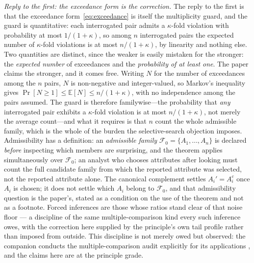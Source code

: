 \textit{Reply to the first: the exceedance form is the correction.}\label{sec:multiplicity} The reply to the first is that the exceedance form~\eqref{eq:exceedance} is itself the multiplicity guard, and the guard is quantitative: each interrogated pair admits a $\kappa$-fold violation with probability at most $1/(1+\kappa)$, so among $n$ interrogated pairs the expected number of $\kappa$-fold violations is at most $n/(1+\kappa)$, by linearity and nothing else. Two quantities are distinct, since the weaker is easily mistaken for the stronger: the \emph{expected number} of exceedances and the \emph{probability of at least one}. The paper claims the stronger, and it comes free. Writing $N$ for the number of exceedances among the $n$ pairs, $N$ is non-negative and integer-valued, so Markov's inequality gives $\Pr[N \ge 1] \le \mathbb{E}[N] \le n/(1+\kappa)$, with no independence among the pairs assumed. The guard is therefore familywise---the probability that \emph{any} interrogated pair exhibits a $\kappa$-fold violation is at most $n/(1+\kappa)$, not merely the average count---and what it requires is that $n$ count the whole admissible family, which is the whole of the burden the selective-search objection imposes. Admissibility has a definition: an \emph{admissible family} $\mathcal{F}_0 = \{A_1, \ldots, A_n\}$ is declared \emph{before} inspecting which members are surprising, and the theorem applies simultaneously over $\mathcal{F}_0$; an analyst who chooses attributes after looking must count the full candidate family from which the reported attribute was selected, not the reported attribute alone. The canonical complement settles $A_i' = A_i^{c}$ once $A_i$ is chosen; it does not settle which $A_i$ belong to $\mathcal{F}_0$, and that admissibility question is the paper's, stated as a condition on the use of the theorem and not as a footnote. Forced inferences are those whose ratios stand clear of that noise floor --- a discipline of the same multiple-comparison kind every such inference owes, with the correction here supplied by the principle's own tail profile rather than imposed from outside. This discipline is not merely owed but observed: the companion conducts the multiple-comparison audit explicitly for its applications \cite{Nexus}, and the claims here are at the principle grade.

